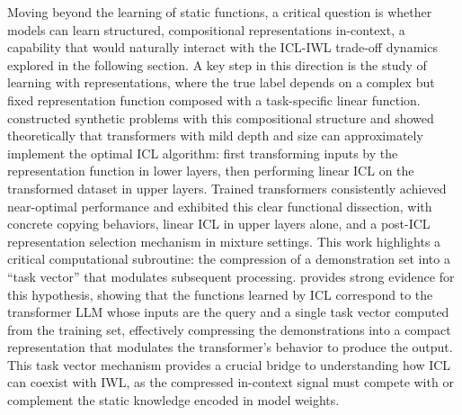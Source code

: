 \documentclass[11pt]{article}
\begin{document}
Moving beyond the learning of static functions, a critical question is whether models can learn structured, compositional representations in-context, a capability that would naturally interact with the ICL-IWL trade-off dynamics explored in the following section. A key step in this direction is the study of learning with representations, where the true label depends on a complex but fixed representation function composed with a task-specific linear function. \cite{ref63} constructed synthetic problems with this compositional structure and showed theoretically that transformers with mild depth and size can approximately implement the optimal ICL algorithm: first transforming inputs by the representation function in lower layers, then performing linear ICL on the transformed dataset in upper layers. Trained transformers consistently achieved near-optimal performance and exhibited this clear functional dissection, with concrete copying behaviors, linear ICL in upper layers alone, and a post-ICL representation selection mechanism in mixture settings. This work highlights a critical computational subroutine: the compression of a demonstration set into a ``task vector'' that modulates subsequent processing. \cite{ref22} provides strong evidence for this hypothesis, showing that the functions learned by ICL correspond to the transformer LLM whose inputs are the query and a single task vector computed from the training set, effectively compressing the demonstrations into a compact representation that modulates the transformer's behavior to produce the output. This task vector mechanism provides a crucial bridge to understanding how ICL can coexist with IWL, as the compressed in-context signal must compete with or complement the static knowledge encoded in model weights.
\end{document}
